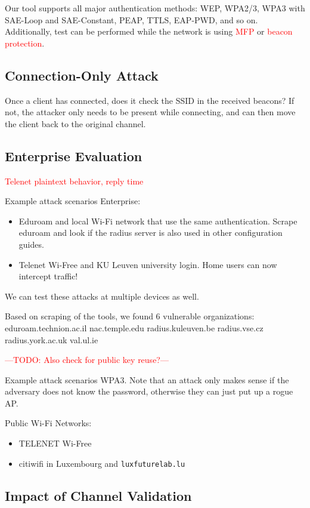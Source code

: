 \documentclass[sigconf,review]{acmart}
\newcommand{\wifi}{\mbox{Wi-Fi}}
\DeclareRobustCommand{\red}[1]{\textcolor{red}{#1}}
\begin{document}
Our tool supports all major authentication methods: WEP, WPA2/3, WPA3 with SAE-Loop and SAE-Constant, PEAP, TTLS, EAP-PWD, and so on.
Additionally, test can be performed while the network is using \red{MFP} or \red{beacon protection}.

\subsection{Connection-Only Attack}

Once a client has connected, does it check the SSID in the received beacons?
If not, the attacker only needs to be present while connecting, and can then move the client back to the original channel.

\subsection{Enterprise Evaluation}

\red{Telenet plaintext behavior, reply time}

Example attack scenarios Enterprise:
\begin{itemize}
	\item Eduroam and local \wifi{} network that use the same authentication.
	Scrape eduroam and look if the radius server is also used in other configuration guides.
	\item Telenet Wi-Free and KU Leuven university login.
	Home users can now intercept traffic!
\end{itemize}

We can test these attacks at multiple devices as well.

Based on scraping of the tools, we found 6 vulnerable organizations:
eduroam.technion.ac.il
nac.temple.edu
radius.kuleuven.be
radius.vse.cz
radius.york.ac.uk
val.ul.ie

\red{---TODO: Also check for public key reuse?---}

Example attack scenarios WPA3.
Note that an attack only makes sense if the adversary does not know the password, otherwise they can just put up a rogue AP.

Public \wifi{} Networks:

\begin{itemize}
	\item TELENET Wi-Free
	\item citiwifi in Luxembourg and \verb|luxfuturelab.lu|
\end{itemize}


\subsection{Impact of Channel Validation}
\label{sec:ocv}
\end{document}
